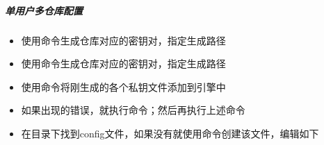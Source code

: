\documentclass[a4paper,10pt,english]{sphinxmanual}
\begin{document}
\subparagraph{单用户多仓库配置}
\label{\detokenize{sphinx/2-collocation/1-github/2-ConfigRemote:id5}}\begin{itemize}
\item {} 
使用命令生成仓库对应的密钥对，指定生成路径

\end{itemize}

\begin{figure}[htbp]
\centering

\noindent{}
\end{figure}
\begin{itemize}
\item {} 
使用命令生成仓库对应的密钥对，指定生成路径

\end{itemize}

\begin{figure}[htbp]
\centering

\noindent{}
\end{figure}
\begin{itemize}
\item {} 
使用命令将刚生成的各个私钥文件添加到引擎中

\end{itemize}

\begin{figure}[htbp]
\centering

\noindent{}
\end{figure}
\begin{itemize}
\item {} 
如果出现的错误，就执行命令；然后再执行上述命令

\end{itemize}

\begin{figure}[htbp]
\centering

\noindent{}
\end{figure}
\begin{itemize}
\item {} 
在目录下找到config文件，如果没有就使用命令创建该文件，编辑如下

\end{itemize}
\end{document}
